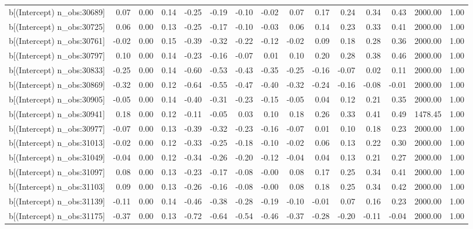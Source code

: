 \begin{table}[ht]
\begin{tabular}{rrrrrrrrrrrrrrr}
  b[(Intercept) n\_obs:30689] & 0.07 & 0.00 & 0.14 & -0.25 & -0.19 & -0.10 & -0.02 & 0.07 & 0.17 & 0.24 & 0.34 & 0.43 & 2000.00 & 1.00 \\ 
  b[(Intercept) n\_obs:30725] & 0.06 & 0.00 & 0.13 & -0.25 & -0.17 & -0.10 & -0.03 & 0.06 & 0.14 & 0.23 & 0.33 & 0.41 & 2000.00 & 1.00 \\ 
  b[(Intercept) n\_obs:30761] & -0.02 & 0.00 & 0.15 & -0.39 & -0.32 & -0.22 & -0.12 & -0.02 & 0.09 & 0.18 & 0.28 & 0.36 & 2000.00 & 1.00 \\ 
  b[(Intercept) n\_obs:30797] & 0.10 & 0.00 & 0.14 & -0.23 & -0.16 & -0.07 & 0.01 & 0.10 & 0.20 & 0.28 & 0.38 & 0.46 & 2000.00 & 1.00 \\ 
  b[(Intercept) n\_obs:30833] & -0.25 & 0.00 & 0.14 & -0.60 & -0.53 & -0.43 & -0.35 & -0.25 & -0.16 & -0.07 & 0.02 & 0.11 & 2000.00 & 1.00 \\ 
  b[(Intercept) n\_obs:30869] & -0.32 & 0.00 & 0.12 & -0.64 & -0.55 & -0.47 & -0.40 & -0.32 & -0.24 & -0.16 & -0.08 & -0.01 & 2000.00 & 1.00 \\ 
  b[(Intercept) n\_obs:30905] & -0.05 & 0.00 & 0.14 & -0.40 & -0.31 & -0.23 & -0.15 & -0.05 & 0.04 & 0.12 & 0.21 & 0.35 & 2000.00 & 1.00 \\ 
  b[(Intercept) n\_obs:30941] & 0.18 & 0.00 & 0.12 & -0.11 & -0.05 & 0.03 & 0.10 & 0.18 & 0.26 & 0.33 & 0.41 & 0.49 & 1478.45 & 1.00 \\ 
  b[(Intercept) n\_obs:30977] & -0.07 & 0.00 & 0.13 & -0.39 & -0.32 & -0.23 & -0.16 & -0.07 & 0.01 & 0.10 & 0.18 & 0.23 & 2000.00 & 1.00 \\ 
  b[(Intercept) n\_obs:31013] & -0.02 & 0.00 & 0.12 & -0.33 & -0.25 & -0.18 & -0.10 & -0.02 & 0.06 & 0.13 & 0.22 & 0.30 & 2000.00 & 1.00 \\ 
  b[(Intercept) n\_obs:31049] & -0.04 & 0.00 & 0.12 & -0.34 & -0.26 & -0.20 & -0.12 & -0.04 & 0.04 & 0.13 & 0.21 & 0.27 & 2000.00 & 1.00 \\ 
  b[(Intercept) n\_obs:31097] & 0.08 & 0.00 & 0.13 & -0.23 & -0.17 & -0.08 & -0.00 & 0.08 & 0.17 & 0.25 & 0.34 & 0.41 & 2000.00 & 1.00 \\ 
  b[(Intercept) n\_obs:31103] & 0.09 & 0.00 & 0.13 & -0.26 & -0.16 & -0.08 & -0.00 & 0.08 & 0.18 & 0.25 & 0.34 & 0.42 & 2000.00 & 1.00 \\ 
  b[(Intercept) n\_obs:31139] & -0.11 & 0.00 & 0.14 & -0.46 & -0.38 & -0.28 & -0.19 & -0.10 & -0.01 & 0.07 & 0.16 & 0.23 & 2000.00 & 1.00 \\ 
  b[(Intercept) n\_obs:31175] & -0.37 & 0.00 & 0.13 & -0.72 & -0.64 & -0.54 & -0.46 & -0.37 & -0.28 & -0.20 & -0.11 & -0.04 & 2000.00 & 1.00 \\ 

\end{tabular}
\end{table}
